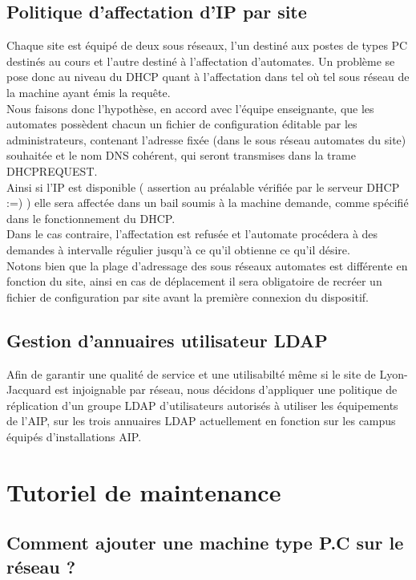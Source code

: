 \documentclass[a4paper]{article}
\begin{document}
\subsection{Politique d'affectation d'IP par site}

Chaque site est équipé de deux sous réseaux, l'un destiné aux postes de types PC destinés au cours et l'autre destiné à l'affectation d'automates. Un problème se pose donc au niveau du DHCP quant à l'affectation dans tel où tel sous réseau de la machine ayant émis la requête.\\
Nous faisons donc l'hypothèse, en accord avec l'équipe enseignante, que les automates possèdent chacun un fichier de configuration éditable par les administrateurs, contenant l'adresse fixée (dans le sous réseau automates du site) souhaitée et le nom DNS cohérent, qui seront transmises dans la trame DHCPREQUEST.\\
Ainsi si l'IP est disponible ( assertion au préalable vérifiée par le serveur DHCP :=) ) elle sera affectée dans un bail soumis à la machine demande, comme spécifié dans le fonctionnement du DHCP.\\
Dans le cas contraire, l'affectation est refusée et l'automate procédera à des demandes à intervalle régulier jusqu'à ce qu'il obtienne ce qu'il désire.\\
Notons bien que la plage d'adressage des sous réseaux automates est différente en fonction du site, ainsi en cas de déplacement il sera obligatoire de recréer un fichier de configuration par site avant la première connexion du dispositif. 

\subsection{Gestion d'annuaires utilisateur LDAP}

Afin de garantir une qualité de service et une utilisabilté même si le site de Lyon-Jacquard est injoignable par réseau, nous décidons d'appliquer une politique de réplication d'un groupe LDAP d'utilisateurs autorisés à utiliser les équipements de l'AIP, sur les trois annuaires LDAP actuellement en fonction sur les campus équipés d'installations AIP.

\section{Tutoriel de maintenance}

\subsection{Comment ajouter une machine type P.C sur le réseau ?}
\end{document}
